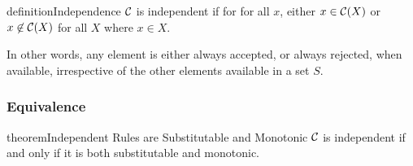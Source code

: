 \begin{restatable}{definition}{Independence}
\label{def:independence}
$\mathcal{C}$ is independent if for
 for all $x$,
either $x \in \mathcal{C}(X)$
or $x \not\in \mathcal{C}(X)$ for all $X$ where $x \in X$.
\end{restatable}

In other words, any element is either always accepted, or always rejected, when available, irrespective of the other elements available in a set $S$.

\subsubsection{Equivalence}

\begin{restatable}{theorem}{Independent Rules are Substitutable and Monotonic}
\label{thm:independent-sub-mon}
$\mathcal{C}$ is independent if and only if it is both substitutable and monotonic.
\end{restatable}

